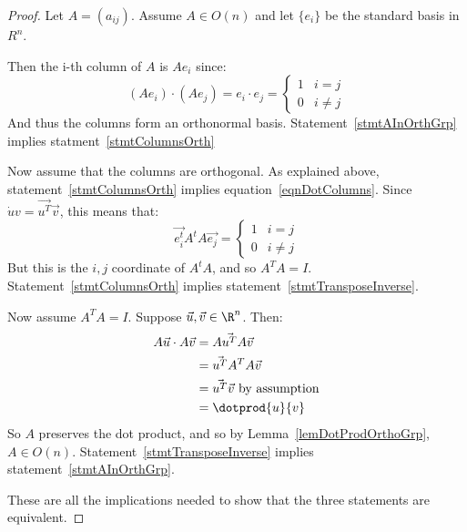 \documentclass[../Main.tex]{subfiles}
\begin{document}
\begin{proof}
    Let $A = (a_{ij})$. Assume $A \in O(n)$ and let $\{e_i\}$ be the standard basis in $R^n$.\par
    Then the i-th column of $A$ is $Ae_i$ since:
    \begin{equation}
        (Ae_i) \cdot (Ae_j) = e_i \cdot e_j =
        \begin{cases}
            1 & i = j \\
            0 & i \neq j
        \end{cases}
        \label{eqnDotColumns}
    \end{equation}
    And thus the columns form an orthonormal basis. Statement~\ref{stmtAInOrthGrp} implies statment~\ref{stmtColumnsOrth}\par
    Now assume that the columns are orthogonal. As explained above, statement~\ref{stmtColumnsOrth} implies equation~\ref{eqnDotColumns}. Since $\dot{u}{v} = \vec{u^T}\vec{v}$, this means that:
    \begin{equation*}
        \vec{e_i^t}A^t A \vec{e_j} = 
        \begin{cases}
            1 & i = j \\
            0 & i \neq j
        \end{cases}
    \end{equation*}
    But this is the $i, j$ coordinate of $A^t A$, and so $A^T A = I$. Statement~\ref{stmtColumnsOrth} implies statement~\ref{stmtTransposeInverse}.\par
    Now assume $A^T A = I$. Suppose $\vec{u}, \vec{v} \in \R^n$. Then:
    \begin{align*}
        A\vec{u} \cdot A\vec{v} &= A \vec{u^T} A \vec{v} \\
        &= \vec{u^T} A^T A \vec{v} \\
        &= \vec{u^T} \vec{v} \text{ by assumption} \\
        &= \dotprod{u}{v}
    \end{align*}
    So $A$ preserves the dot product, and so by Lemma~\ref{lemDotProdOrthoGrp}, $A \in O(n)$. Statement~\ref{stmtTransposeInverse} implies statement~\ref{stmtAInOrthGrp}.\par
    These are all the implications needed to show that the three statements are equivalent.
\end{proof}
\end{document}
